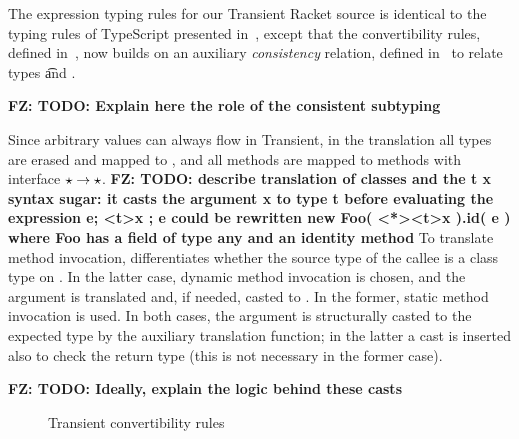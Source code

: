 \documentclass[acmlarge, anonymous, authordraft, review]{acmart} %
\newcommand{\FZ}[1]{\textbf{FZ: #1}}
\begin{document}
The expression typing rules for our Transient Racket source is identical to the typing rules of TypeScript presented in~, except that the convertibility rules, defined in~, now builds on an auxiliary \emph{consistency}  relation, defined in~ to relate types \t and \tp.
 
\FZ{TODO: Explain here the role of the consistent subtyping}

Since arbitrary values can always flow in Transient, in the \kafka translation all types are erased and mapped to \any, and all methods are mapped to methods with interface \(\any \to \any\).   \FZ{TODO: describe translation of classes and the t x syntax sugar: it casts the argument x to type t before evaluating the expression e; <t>x ;  e  could be rewritten  new Foo( <*><t>x ).id( e )  where Foo has a field of type any and an identity method } To translate method invocation, \kafka differentiates whether the source type of the callee is a class type \C on \any.  In the latter case, dynamic method invocation is chosen, and the argument is translated and, if needed, casted to \any.  In the former, static method invocation is used.  In both cases, the argument is structurally casted to the expected type by the auxiliary translation function; in the latter a cast is inserted also to check the return type (this is not necessary in the former case).

\FZ{TODO: Ideally, explain the logic behind these casts}



\begin{figure}
\hrulefill
\begin{mathpar}




\end{mathpar}
\hrulefill
\caption{Transient convertibility rules}\label{f:transientts}
\end{figure}
\end{document}

